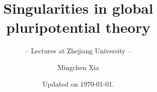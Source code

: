 \documentclass[envcountsect]{svmono}
\begin{document}
\author{Mingchen Xia}
\title{Singularities in global pluripotential theory}
\subtitle{-- Lectures at Zhejiang University --}
\date{Updated on \today.}
\maketitle








\frontmatter%





%
%



\tableofcontents




\mainmatter%
























\appendix




\backmatter%
%
%
\printindex






\end{document}
